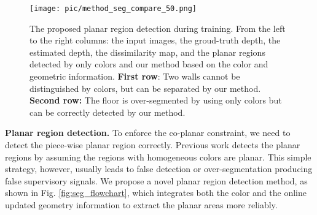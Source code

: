 \documentclass[10pt,twocolumn,letterpaper]{article}
\newcommand{\Fig}[1]{Fig. \ref{#1}}
\begin{document}
\begin{figure*}[ht]
	\centering
	\texttt{[image: pic/method\_seg\_compare\_50.png]} \caption{The proposed planar region detection during training.
		From the left to the right columns: the input images, the groud-truth depth, the estimated depth, the dissimilarity map, and the planar regions detected by only colors \cite{yu2020p} and our method based on the color and geometric information.
		\textbf{First row}: Two walls cannot be distinguished by colors, but can be separated by our method.
		\textbf{Second row:} The floor is over-segmented by using only colors but can be correctly detected by our method.
	}
	\label{fig:method_seg_compare}
\end{figure*}

\textbf{Planar region detection.}
To enforce the co-planar constraint, we need to detect the piece-wise planar region correctly. Previous work \cite{yu2020p} detects the planar regions by assuming the regions with homogeneous colors are planar. This simple strategy, however, usually leads to false detection or over-segmentation producing false supervisory signals. We propose a novel planar region detection method, as shown in \Fig{fig:seg_flowchart}, which integrates both the color and the online updated geometry information to extract the planar areas more reliably. 
\end{document}
